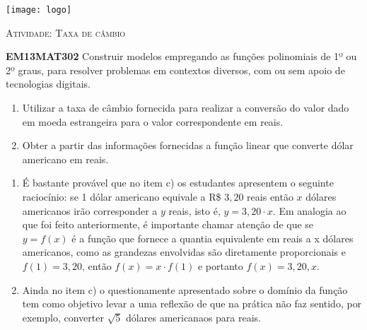 \documentclass[10 pt,usenames,dvipsnames, oneside]{article}
\begin{document}
\begin{center}
  \begin{minipage}[l]{3cm}
\texttt{[image: logo]}    
\end{minipage}\hfill
\begin{minipage}[r]{.8\textwidth}
 {\Large \scshape Atividade: Taxa de câmbio}  
\end{minipage}
\end{center}
\vspace{.2cm}

\ifdefined\prof
\begin{objetivos}
\item \textbf{EM13MAT302} Construir modelos empregando as funções polinomiais de 1º ou 2º graus, para resolver problemas em contextos diversos, com ou sem apoio de tecnologias digitais.
\end{objetivos}

\begin{goals}
\begin{enumerate}
\item Utilizar a taxa de câmbio fornecida para realizar a conversão do valor dado em moeda estrangeira para o valor correspondente em reais.

\item Obter a partir das informações fornecidas a função linear que converte dólar americano em reais.

\end{enumerate}

\tcblower

\begin{enumerate}
\item É bastante provável que no item c) os estudantes apresentem o seguinte raciocínio: se 1 dólar americano equivale a R\$ $3{,}20$ reais então $x$ dólares americanos irão corresponder a $y$ reais, isto é, $y=3,20\cdot x$. Em analogia ao que foi feito anteriormente, é importante chamar atenção de que se $y=f(x)$ é a função que fornece a quantia equivalente em reais a x dólares americanos, como as grandezas envolvidas são diretamente proporcionais e $f(1)=3{,}20$, então $f(x)=x\cdot f(1)$ e portanto $f(x)=3{,}20{,}x$.

\item Ainda no item c) o questionamente apresentado sobre o domínio da função tem como objetivo levar a uma reflexão de que na prática não faz sentido, por exemplo, converter $\sqrt{5}$ dólares americanaos para reais.
\end{enumerate}

\end{goals}
\end{document}
